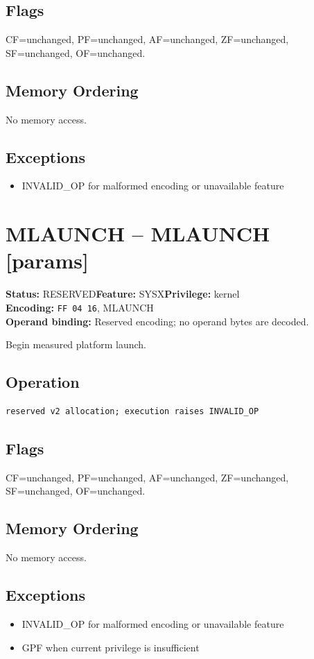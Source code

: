 \documentclass[10pt]{article}
\begin{document}
\subsection*{Flags}
CF=unchanged, PF=unchanged, AF=unchanged, ZF=unchanged, SF=unchanged, OF=unchanged.
\subsection*{Memory Ordering}
No memory access.
\subsection*{Exceptions}
\begin{itemize}
\item INVALID\_OP for malformed encoding or unavailable feature
\end{itemize}
\clearpage

\section{MLAUNCH -- MLAUNCH [params]}
\textbf{Status:} RESERVED\quad \textbf{Feature:} SYSX\quad \textbf{Privilege:} kernel\\
\textbf{Encoding:} \texttt{FF 04 16}, MLAUNCH\\
\textbf{Operand binding:} Reserved encoding; no operand bytes are decoded.

Begin measured platform launch.

\subsection*{Operation}
\begin{lstlisting}
reserved v2 allocation; execution raises INVALID_OP
\end{lstlisting}
\subsection*{Flags}
CF=unchanged, PF=unchanged, AF=unchanged, ZF=unchanged, SF=unchanged, OF=unchanged.
\subsection*{Memory Ordering}
No memory access.
\subsection*{Exceptions}
\begin{itemize}
\item INVALID\_OP for malformed encoding or unavailable feature
\item GPF when current privilege is insufficient
\end{itemize}
\clearpage
\end{document}
